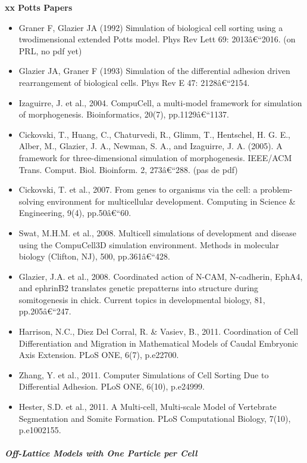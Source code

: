 \textbf{xx Potts Papers}
\begin{itemize}
	\item Graner F, Glazier JA (1992) Simulation of biological cell sorting using a twodimensional extended Potts model. Phys Rev Lett 69: 2013â€“2016. (on PRL, no pdf yet)
	\item Glazier JA, Graner F (1993) Simulation of the differential adhesion driven rearrangement of biological cells. Phys Rev E 47: 2128â€“2154. \cite{Glazier:1993ck}
	\item Izaguirre, J. et al., 2004. CompuCell, a multi-model framework for simulation of morphogenesis. Bioinformatics, 20(7), pp.1129â€“1137. \cite{Izaguirre:2004vr}
	\item Cickovski, T., Huang, C., Chaturvedi, R., Glimm, T., Hentschel, H. G. E., Alber, M., Glazier, J. A., Newman, S. A., and Izaguirre, J. A. (2005). A framework for three-dimensional simulation of morphogenesis. IEEE/ACM Trans. Comput. Biol. Bioinform. 2, 273â€“288. (pas de pdf)
	\item Cickovski, T. et al., 2007. From genes to organisms via the cell: a problem-solving environment for multicellular development. Computing in Science \& Engineering, 9(4), pp.50â€“60. \cite{Cickovski:2007tj}
	\item Swat, M.H.M. et al., 2008. Multicell simulations of development and disease using the CompuCell3D simulation environment. Methods in molecular biology (Clifton, NJ), 500, pp.361â€“428. \cite{Swat:2008di}
	\item Glazier, J.A. et al., 2008. Coordinated action of N-CAM, N-cadherin, EphA4, and ephrinB2 translates genetic prepatterns into structure during somitogenesis in chick. Current topics in developmental biology, 81, pp.205â€“247. \cite{Glazier:2008kc}
	\item Harrison, N.C., Diez Del Corral, R. \& Vasiev, B., 2011. Coordination of Cell Differentiation and Migration in Mathematical Models of Caudal Embryonic Axis Extension. PLoS ONE, 6(7), p.e22700. \cite{Harrison:2011hg}
	\item Zhang, Y. et al., 2011. Computer Simulations of Cell Sorting Due to Differential Adhesion. PLoS ONE, 6(10), p.e24999. \cite{Zhang:2011ca}
	\item Hester, S.D. et al., 2011. A Multi-cell, Multi-scale Model of Vertebrate Segmentation and Somite Formation. PLoS Computational Biology, 7(10), p.e1002155. \cite{Hester:2011dc}
\end{itemize}

\subparagraph{Off-Lattice Models with One Particle per Cell}


